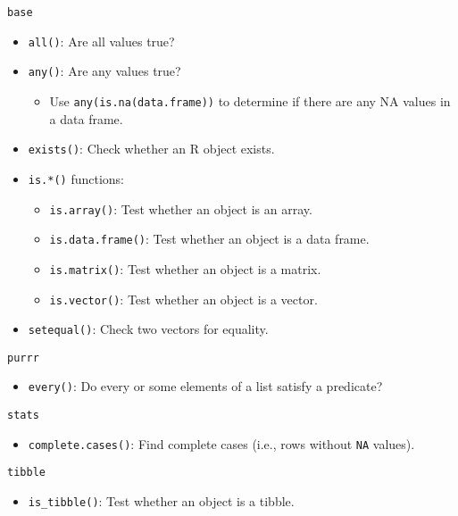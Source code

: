 \documentclass[]{book}
\providecommand{\tightlist}{%
  \setlength{\itemsep}{0pt}\setlength{\parskip}{0pt}}
\theoremstyle{definition}
\theoremstyle{definition}
\theoremstyle{definition}
\theoremstyle{remark}
\begin{document}
\texttt{base}

\begin{itemize}
\tightlist
\item
  \texttt{all()}: Are all values true?
\item
  \texttt{any()}: Are any values true?

  \begin{itemize}
  \tightlist
  \item
    Use \texttt{any(is.na(data.frame))} to determine if there are any NA
    values in a data frame.
  \end{itemize}
\item
  \texttt{exists()}: Check whether an R object exists.
\item
  \texttt{is.*()} functions:

  \begin{itemize}
  \tightlist
  \item
    \texttt{is.array()}: Test whether an object is an array.
  \item
    \texttt{is.data.frame()}: Test whether an object is a data frame.
  \item
    \texttt{is.matrix()}: Test whether an object is a matrix.
  \item
    \texttt{is.vector()}: Test whether an object is a vector.
  \end{itemize}
\item
  \texttt{setequal()}: Check two vectors for equality.
\end{itemize}

\texttt{purrr}

\begin{itemize}
\tightlist
\item
  \texttt{every()}: Do every or some elements of a list satisfy a
  predicate?
\end{itemize}

\texttt{stats}

\begin{itemize}
\tightlist
\item
  \texttt{complete.cases()}: Find complete cases (i.e., rows without
  \texttt{NA} values).
\end{itemize}

\texttt{tibble}

\begin{itemize}
\tightlist
\item
  \texttt{is\_tibble()}: Test whether an object is a tibble.
\end{itemize}
\end{document}
